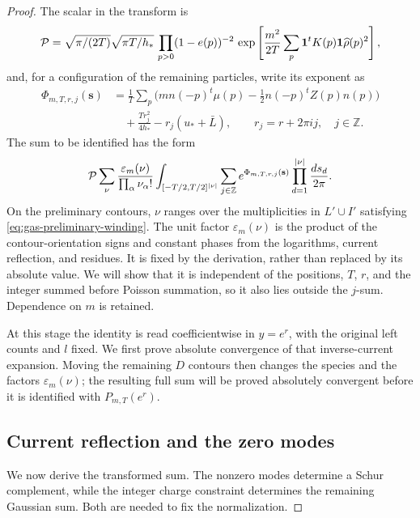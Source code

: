 \begin{proof}
The scalar in the transform is
\begin{equation}\label{eq:gas-transform-scalar}
 {\cal P}= \sqrt{\pi/(2T)}\sqrt{\pi T/h_*}\,
 \prod_{p>0}(1-e(p))^{-2}\,
 \exp\left[\frac{m^2}{2T}\sum_p {\bf1}^t K(p){\bf1}\widehat\rho(p)^2\right],
\end{equation}
and, for a configuration of the remaining particles, write its exponent as
\begin{equation}
 \begin{aligned}
 \Phi_{m,T,r,j}(\mathbf s)&=
 \frac1T\sum_p\big(m n(-p)^t\mu(p)-\tfrac12 n(-p)^t Z(p)n(p)\big)
 \\
 &\quad+\frac{T r_j^2}{4h_*}-r_j(u_*+\bar L),
 \qquad r_j=r+2\pi i j,\quad j\in{\mathbb Z}.
 \end{aligned}
 \label{eq:legacy-P-star}
\end{equation}
The sum to be identified has the form
\begin{equation}\label{eq:gas-grand-sum}
 {\cal P}\sum_{\nu}\frac{\varepsilon_m(\nu)}{\prod_\alpha\nu_\alpha!}
 \int_{[-T/2,T/2]^{|\nu|}}
 \sum_{j\in\mathbb Z}e^{\Phi_{m,T,r,j}(\mathbf s)}
 \prod_{d=1}^{|\nu|}\frac{ds_d}{2\pi}.
\end{equation}
On the preliminary contours, \(\nu\) ranges over the multiplicities in
\(L'\cup I'\) satisfying \eqref{eq:gas-preliminary-winding}.
The unit factor \(\varepsilon_m(\nu)\) is the product of the
contour-orientation signs and constant phases from the logarithms,
current reflection, and residues. It is fixed by the derivation, rather
than replaced by its absolute value. We will show that it is independent
of the positions, \(T\), \(r\), and the integer summed before Poisson
summation, so it also lies outside the \(j\)-sum. Dependence on \(m\)
is retained.

At this stage the identity is read coefficientwise in \(y=e^r\), with
the original left counts and \(l\) fixed. We first prove absolute
convergence of that inverse-current expansion. Moving the remaining
\(D\) contours then changes the species and the factors
\(\varepsilon_m(\nu)\); the resulting full sum will be proved
absolutely convergent before it is identified with \(P_{m,T}(e^r)\).

\subsection{Current reflection and the zero modes}
We now derive the transformed sum. The nonzero modes determine a Schur complement, while the integer charge constraint determines the remaining Gaussian sum. Both are needed to fix the normalization.


\end{proof}
